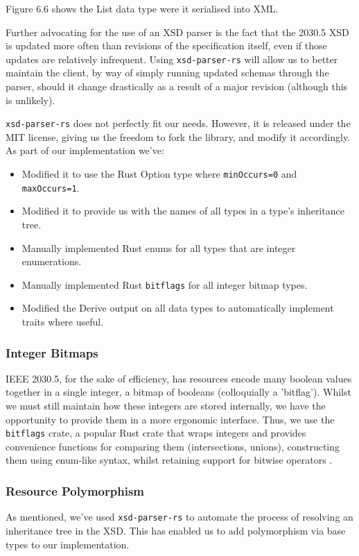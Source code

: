 Figure 6.6 shows the List data type were it serialised into XML.

Further advocating for the use of an XSD parser is the fact that the 2030.5 XSD is updated more often than revisions of the specification itself, even if those updates are relatively infrequent.
Using \texttt{xsd-parser-rs} will allow us to better maintain the client, by way of simply running updated schemas through the parser, should it change drastically as a result of a major revision (although this is unlikely).

\texttt{xsd-parser-rs} does not perfectly fit our needs. However, it is released under the MIT license, giving us the freedom to fork the library, and modify it accordingly. As part of our implementation we've:

\begin{itemize}
    \item Modified it to use the Rust Option type where \texttt{minOccurs=0} and \texttt{maxOccurs=1}.
    \item Modified it to provide us with the names of all types in a type's inheritance tree.
    \item Manually implemented Rust enums for all types that are integer enumerations.
    \item Manually implemented Rust \texttt{bitflags} for all integer bitmap types.
    \item Modified the Derive output on all data types to automatically implement traits where useful.  
\end{itemize}

\subsubsection{Integer Bitmaps}
IEEE 2030.5, for the sake of efficiency, has resources encode many boolean values together in a single integer, a bitmap of booleans (colloquially a 'bitflag'). Whilst we must still maintain how these integers are stored internally, we have the opportunity to provide them in a more ergonomic interface. Thus, we use the \texttt{bitflags} crate, a popular Rust crate that wraps integers and provides convenience functions for comparing them (intersections, unions), constructing them using enum-like syntax, whilst retaining support for bitwise operators \cite{bitflags}. 

\subsubsection{Resource Polymorphism}
As mentioned, we've used \texttt{xsd-parser-rs} to automate the process of resolving an inheritance tree in the XSD. This has enabled us to add polymorphism via base types to our implementation.

